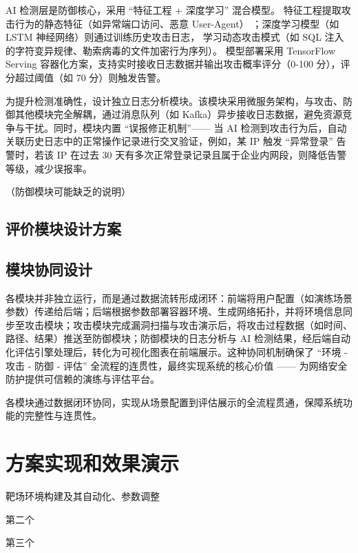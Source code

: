 \documentclass[lang=cn,10pt]{elegantbook}
\begin{document}
AI 检测层是防御核心，采用 “特征工程 + 深度学习” 混合模型。
特征工程提取攻击行为的静态特征（如异常端口访问、恶意 User-Agent）
；深度学习模型（如 LSTM 神经网络）则通过训练历史攻击日志，
学习动态攻击模式（如 SQL 注入的字符变异规律、勒索病毒的文件加密行为序列）。
模型部署采用 TensorFlow Serving 容器化方案，支持实时接收日志数据并输出攻击概率评分（0-100 分），评分超过阈值（如 70 分）则触发告警。

为提升检测准确性，设计独立日志分析模块。该模块采用微服务架构，与攻击、防御其他模块完全解耦，通过消息队列（如 Kafka）异步接收日志数据，避免资源竞争与干扰。同时，模块内置 “误报修正机制”—— 当 AI 检测到攻击行为后，自动关联历史日志中的正常操作记录进行交叉验证，例如，某 IP 触发 “异常登录” 告警时，若该 IP 在过去 30 天有多次正常登录记录且属于企业内网段，则降低告警等级，减少误报率。

\begin{proposition}
（防御模块可能缺乏的说明）
\end{proposition}



\section{评价模块设计方案}


\section{模块协同设计}
各模块并非独立运行，而是通过数据流转形成闭环：前端将用户配置（如演练场景参数）传递给后端；后端根据参数部署容器环境、生成网络拓扑，并将环境信息同步至攻击模块；攻击模块完成漏洞扫描与攻击演示后，将攻击过程数据（如时间、路径、结果）推送至防御模块；防御模块的日志分析与 AI 检测结果，经后端自动化评估引擎处理后，转化为可视化图表在前端展示。这种协同机制确保了 “环境 - 攻击 - 防御 - 评估” 全流程的连贯性，最终实现系统的核心价值 —— 为网络安全防护提供可信赖的演练与评估平台。
\begin{definition}
    各模块通过数据闭环协同，实现从场景配置到评估展示的全流程贯通，保障系统功能的完整性与连贯性。
\end{definition}

\chapter{方案实现和效果演示}
\begin{introduction}
  \item 靶场环境构建及其自动化、参数调整
  \item 第二个
  \item 第三个
\end{introduction}
\end{document}
